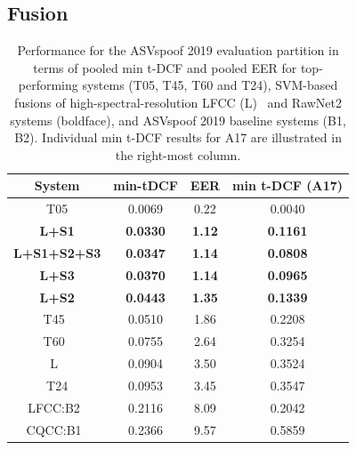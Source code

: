 \documentclass{article}
\begin{document}
\subsection{Fusion}

\begin{table}[!t]
	\centering
	\small

	\caption{Performance for the ASVspoof 2019 evaluation partition in terms of pooled min t-DCF and pooled EER for top-performing systems (T05, T45, T60 and T24), SVM-based fusions of high-spectral-resolution LFCC (L)~\cite{IS2020LFCC} and RawNet2 systems (boldface), and ASVspoof 2019 baseline systems (B1, B2). Individual min t-DCF results for A17 are illustrated in the right-most column.}
 \setlength\tabcolsep{2.5pt}
	\begin{tabular}{ *{4}{c}}
		\hline
		 System & min-tDCF& EER& min t-DCF (A17) 	\\ 
	\hline	
	   T05&0.0069&0.22&0.0040\\
	   \hline
	  
	   {\bfseries L+S1}&{\bfseries 0.0330}&{\bfseries 1.12}&{\bfseries 0.1161}\\
	   \hline
	   {\bfseries L+S1+S2+S3} & {\bfseries 0.0347}&{\bfseries 1.14}&{\bfseries 0.0808}\\
	   
	   \hline
	   {\bfseries L+S3}&{\bfseries 0.0370}&{\bfseries 1.14}&{\bfseries 0.0965}\\
	   \hline
	  
	   { \bfseries L+S2}&{\bfseries 0.0443}&{\bfseries 1.35}&{\bfseries 0.1339}\\
	   \hline
	   
	   
	   T45~\cite{lavrentyeva2019stc}&0.0510&1.86&0.2208\\
	
		 
		 \hline
		 
		  T60~\cite{chettri2019ensemble}&0.0755&2.64&0.3254\\
		\hline
		
		
		
		 L~\cite{IS2020LFCC} &0.0904&3.50&0.3524\\
		 \hline
		 T24& 0.0953 &3.45&0.3547\\ 
		 \hline
	
		
		 LFCC:B2~\cite{todisco2019asvspoof}&0.2116&8.09&0.2042\\
		 \hline
	   CQCC:B1~\cite{todisco2019asvspoof}&0.2366&9.57&0.5859\\
		\hline
	
	\end{tabular}
	\label{Tab:comparsion results}
	\vspace{-0.15cm}
\end{table}
\end{document}
